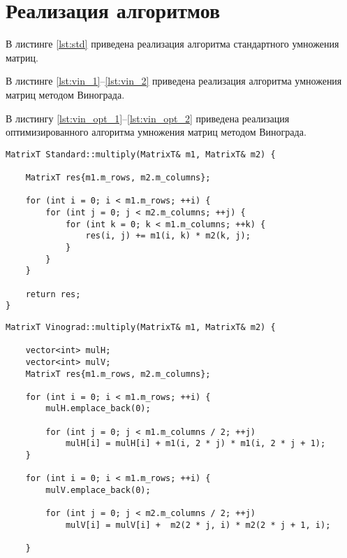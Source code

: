 \section{Реализация алгоритмов}
В листинге \ref{lst:std} приведена реализация алгоритма стандартного умножения матриц.

В листинге \ref{lst:vin_1}--\ref{lst:vin_2} приведена реализация алгоритма умножения матриц методом Винограда.

В листингу \ref{lst:vin_opt_1}--\ref{lst:vin_opt_2} приведена реализация оптимизированного алгоритма умножения матриц методом Винограда.

\begin{lstlisting}[label=lst:std, caption=Функция стандартного умножения матриц]
MatrixT Standard::multiply(MatrixT& m1, MatrixT& m2) {

    MatrixT res{m1.m_rows, m2.m_columns};

    for (int i = 0; i < m1.m_rows; ++i) {
        for (int j = 0; j < m2.m_columns; ++j) {
            for (int k = 0; k < m1.m_columns; ++k) {
                res(i, j) += m1(i, k) * m2(k, j);
            }
        }
    }

    return res;
}    
\end{lstlisting}

\clearpage

\begin{lstlisting}[label=lst:vin_1, caption=Функция умножения матриц методом Винограда (часть 1)]
MatrixT Vinograd::multiply(MatrixT& m1, MatrixT& m2) {

    vector<int> mulH;
    vector<int> mulV;
    MatrixT res{m1.m_rows, m2.m_columns};

    for (int i = 0; i < m1.m_rows; ++i) {
        mulH.emplace_back(0);

        for (int j = 0; j < m1.m_columns / 2; ++j) 
            mulH[i] = mulH[i] + m1(i, 2 * j) * m1(i, 2 * j + 1); 
    }

    for (int i = 0; i < m1.m_rows; ++i) {
        mulV.emplace_back(0);

        for (int j = 0; j < m2.m_columns / 2; ++j) 
            mulV[i] = mulV[i] +  m2(2 * j, i) * m2(2 * j + 1, i);
        
    }
\end{lstlisting}

\clearpage

